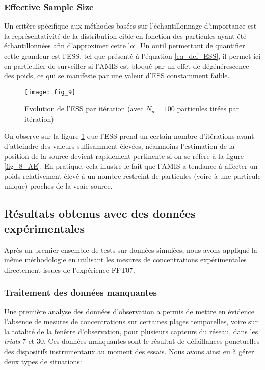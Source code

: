  \subsubsection{Effective Sample Size}
 
 Un critère spécifique aux méthodes basées sur l'échantillonnage d'importance est la représentativité de la distribution cible en fonction des particules ayant été échantillonnées afin d'approximer cette loi. Un outil permettant de quantifier cette grandeur est l'ESS, tel que présenté à l'équation \eqref{eq_def_ESS}, il permet ici en particulier de surveiller si l'AMIS est bloqué par un effet de dégénérescence des poids, ce qui se manifeste par une valeur d'ESS constamment faible. \\
 
 \begin{figure}[h!]
 	\centering
 	\texttt{[image: fig\_9]}
 	\caption{Evolution de l'ESS par itération (avec $N_p=100$ particules tirées par itération)}
 	\label{fig_9_AE}
 \end{figure}
 
 On observe sur la figure \ref{fig_9_AE} que l'ESS prend un certain {nombre d'itérations} avant d'atteindre des valeurs suffisamment élevées, néanmoins l'estimation de la position de la source devient rapidement pertinente si on se réfère à la figure \ref{fig_8_AE}. En pratique, cela illustre le fait que l'AMIS a tendance à affecter un poids relativement élevé à un nombre restreint de particules (voire à une particule unique) proches de la vraie source. 
 
 
 \subsection{Résultats obtenus avec des données expérimentales}
 
 Après un premier ensemble de tests sur données simulées, nous avons appliqué la même méthodologie en utilisant les mesures de concentrations expérimentales directement issues de l'expérience FFT07. \\
 
 \subsubsection{Traitement des données manquantes}
 
 Une première analyse des données d'observation a permis de mettre en évidence l'absence de mesures de concentrations sur certaines plages temporelles, voire sur la totalité de la fenêtre d'observation, pour plusieurs capteurs du réseau, dans les \textit{trials} 7 et 30. Ces données manquantes sont le résultat de défaillances ponctuelles des dispositifs instrumentaux au moment des essais. Nous avons ainsi eu à gérer deux types de situations:
 
